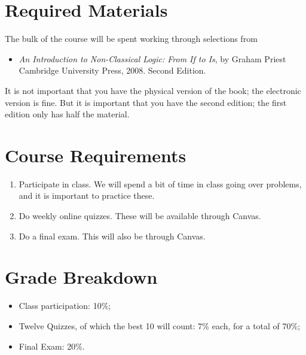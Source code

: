 \documentclass[
]{article}
\providecommand{\tightlist}{%
  \setlength{\itemsep}{0pt}\setlength{\parskip}{0pt}}\usepackage{longtable,booktabs,array}
\begin{document}
\newpage

\hypertarget{required-materials}{%
\section{Required Materials}\label{required-materials}}

The bulk of the course will be spent working through selections from

\begin{itemize}
\tightlist
\item
  \emph{An Introduction to Non-Classical Logic: From If to Is}, by
  Graham Priest Cambridge University Press, 2008. Second Edition.
\end{itemize}

It is not important that you have the physical version of the book; the
electronic version is fine. But it is important that you have the second
edition; the first edition only has half the material.

\hypertarget{course-requirements}{%
\section{Course Requirements}\label{course-requirements}}

\begin{enumerate}
\def\labelenumi{\arabic{enumi}.}
\item
  Participate in class. We will spend a bit of time in class going over
  problems, and it is important to practice these.
\item
  Do weekly online quizzes. These will be available through Canvas.
\item
  Do a final exam. This will also be through Canvas.
\end{enumerate}

\hypertarget{grade-breakdown}{%
\section{Grade Breakdown}\label{grade-breakdown}}

\begin{itemize}
\tightlist
\item
  Class participation: 10\%;
\item
  Twelve Quizzes, of which the best 10 will count: 7\% each, for a total
  of 70\%;
\item
  Final Exam: 20\%.
\end{itemize}
\end{document}
